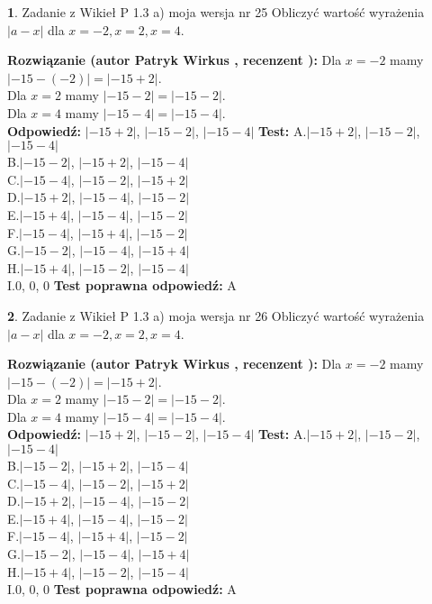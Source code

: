 \documentclass[12pt, a4paper]{article}
\theoremstyle{definition} %
\newtheorem{zad}{}
\newcommand{\zadStart}[1]{\begin{zad}#1\newline}
\newcommand{\zadStop}{\end{zad}}
\newcommand{\rozwStart}[2]{\noindent \textbf{Rozwiązanie (autor #1 , recenzent #2): }\newline}
\newcommand{\rozwStop}{\newline}
\newcommand{\odpStart}{\noindent \textbf{Odpowiedź:}\newline}
\newcommand{\odpStop}{\newline}
\newcommand{\testStart}{\noindent \textbf{Test:}\newline}
\newcommand{\testStop}{\newline}
\newcommand{\kluczStart}{\noindent \textbf{Test poprawna odpowiedź:}\newline}
\newcommand{\kluczStop}{\newline}
\begin{document}
\zadStart{Zadanie z Wikieł P 1.3 a) moja wersja nr 25}
Obliczyć wartość wyrażenia $|a - x|$ dla $x=-2,x=2,x=4$.
\zadStop
\rozwStart{Patryk Wirkus}{}
Dla $x = -2$ mamy $|-15 - (-2)| = |-15 + 2|$.\\
Dla $x = 2$ mamy $|-15 - 2| = |-15 - 2|$.\\
Dla $x = 4$ mamy $|-15 - 4| = |-15 - 4|$.\\
\rozwStop
\odpStart
$|-15 + 2|$, $|-15 - 2|$, $|-15 - 4|$
\odpStop
\testStart
A.$|-15 + 2|$, $|-15 - 2|$, $|-15 - 4|$\\
B.$|-15 - 2|$, $|-15 + 2|$, $|-15 - 4|$\\
C.$|-15 - 4|$, $|-15 - 2|$, $|-15 + 2|$\\
D.$|-15 + 2|$, $|-15 - 4|$, $|-15 - 2|$\\
E.$|-15 + 4|$, $|-15 - 4|$, $|-15 - 2|$\\
F.$|-15 - 4|$, $|-15 + 4|$, $|-15 - 2|$\\
G.$|-15 - 2|$, $|-15 - 4|$, $|-15 + 4|$\\
H.$|-15 + 4|$, $|-15 - 2|$, $|-15 - 4|$\\
I.$0$, $0$, $0$
\testStop
\kluczStart
A
\kluczStop



\zadStart{Zadanie z Wikieł P 1.3 a) moja wersja nr 26}
Obliczyć wartość wyrażenia $|a - x|$ dla $x=-2,x=2,x=4$.
\zadStop
\rozwStart{Patryk Wirkus}{}
Dla $x = -2$ mamy $|-15 - (-2)| = |-15 + 2|$.\\
Dla $x = 2$ mamy $|-15 - 2| = |-15 - 2|$.\\
Dla $x = 4$ mamy $|-15 - 4| = |-15 - 4|$.\\
\rozwStop
\odpStart
$|-15 + 2|$, $|-15 - 2|$, $|-15 - 4|$
\odpStop
\testStart
A.$|-15 + 2|$, $|-15 - 2|$, $|-15 - 4|$\\
B.$|-15 - 2|$, $|-15 + 2|$, $|-15 - 4|$\\
C.$|-15 - 4|$, $|-15 - 2|$, $|-15 + 2|$\\
D.$|-15 + 2|$, $|-15 - 4|$, $|-15 - 2|$\\
E.$|-15 + 4|$, $|-15 - 4|$, $|-15 - 2|$\\
F.$|-15 - 4|$, $|-15 + 4|$, $|-15 - 2|$\\
G.$|-15 - 2|$, $|-15 - 4|$, $|-15 + 4|$\\
H.$|-15 + 4|$, $|-15 - 2|$, $|-15 - 4|$\\
I.$0$, $0$, $0$
\testStop
\kluczStart
A
\kluczStop
\end{document}
